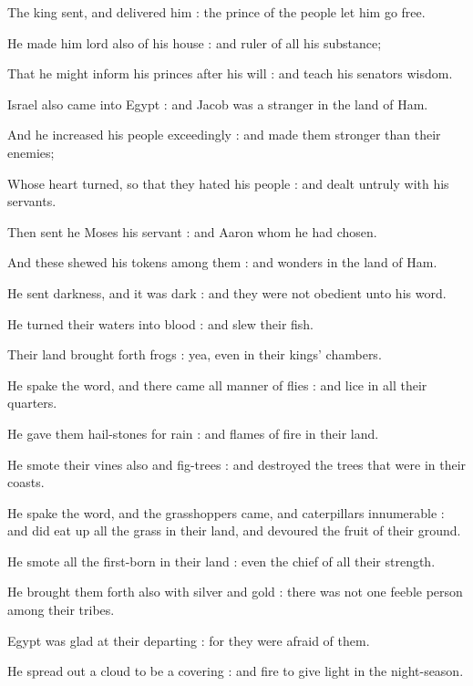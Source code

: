The king sent, and delivered him : the prince of the people let him go free.\par
{}He made him lord also of his house : and ruler of all his substance;\par
{}That he might inform his princes after his will : and teach his senators wisdom.\par
{}Israel also came into Egypt : and Jacob was a stranger in the land of Ham.\par
{}And he increased his people exceedingly : and made them stronger than their enemies;\par
{}Whose heart turned, so that they hated his people : and dealt untruly with his servants.\par
{}Then sent he Moses his servant : and Aaron whom he had chosen.\par
{}And these shewed his tokens among them : and wonders in the land of Ham.\par
{}He sent darkness, and it was dark : and they were not obedient unto his word.\par
{}He turned their waters into blood : and slew their fish.\par
{}Their land brought forth frogs : yea, even in their kings' chambers.\par
{}He spake the word, and there came all manner of flies : and lice in all their quarters.\par
{}He gave them hail-stones for rain : and flames of fire in their land.\par
{}He smote their vines also and fig-trees : and destroyed the trees that were in their coasts.\par
{}He spake the word, and the grasshoppers came, and caterpillars innumerable : and did eat up all the grass in their land, and devoured the fruit of their ground.\par
{}He smote all the first-born in their land : even the chief of all their strength.\par
{}He brought them forth also with silver and gold : there was not one feeble person among their tribes.\par
{}Egypt was glad at their departing : for they were afraid of them.\par
{}He spread out a cloud to be a covering : and fire to give light in the night-season.\par
